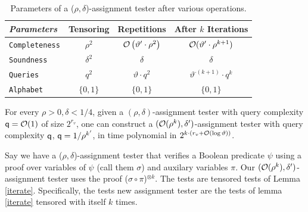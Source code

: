 \begin{table}\label{roundup}
\centering
\begin{tabular}{|l|c|c|c|}
\hline
{\em Parameters}  &{ Tensoring} & {\parbox{0.85in}{Repetitions}} & \parbox{0.7in}{After $k$\\ Iterations}\\
	\hline
        \hline
        {\tt Completeness} & $\rho^2$ & ${\cal O}\left(\vartheta' \cdot \rho^2\right)$  &  ${\cal O}(\vartheta' \cdot \rho^{k + 1})$ \\  
        {\tt Soundness} &   $\delta^2$ & $\delta$&  $\delta$ \\
        {\tt Queries} &   $q^2$ & $\vartheta\cdot q^2$ & $\vartheta^{ \cdot (k + 1)} \cdot  q^{k} $ \\
        {\tt Alphabet}&    $\{0,1\}$ & $\{0,1\}$ & $\{0,1\}$ \\
        \hline
\end{tabular} %
  \caption{Parameters of a ($\rho, \delta$)-assignment tester after various operations.}
\end{table}


\begin{lemma}\label{Camplify}
  For every $\rho > 0, \delta < 1/4$, given a $(\rho,
  \delta)$-assignment tester with query complexity ${\sf q} = {\cal O}(1)$
  of size $2^{r_v}$, one can construct a $({\cal
    O}(\rho^k),\delta')$-assignment tester with query complexity ${\sf q}$,
  ${\sf q} = 1/\rho^{k'}$, in time polynomial in $2^{ k \cdot \left(r_v +
      {\cal O}\left(\log \vartheta\right)\right)}$.
\end{lemma}
 Say we have a ($\rho, \delta$)-assignment tester
that verifies a Boolean predicate $\psi$ using a proof over variables
of $\psi$ (call them $\sigma$) and auxilary variables $\pi$. Our
$({\cal O}(\rho^k),\delta')$-assignment tester uses the proof ($\sigma
\circ \pi$)$^{\otimes k}$. The tests are tensored tests of Lemma
\ref{iterate}. Specifically, the tests new assignment tester are the
tests of lemma \ref{iterate} tensored with itself $k$ times.

